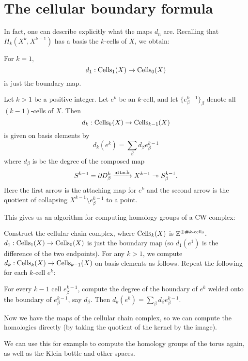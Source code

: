 \section{The cellular boundary formula}
In fact, one can describe explicitly what the maps $d_n$ are.
Recalling that $H_k(X^k, X^{k-1})$ has a basis the $k$-cells of $X$, we obtain:
\begin{theorem}
	[Cellular boundary formula for $k=1$]
	For $k=1$, \[ d_1 : \operatorname{Cells}_1(X) \to \operatorname{Cells}_0(X) \] is just the boundary map.
\end{theorem}
\begin{theorem}
	Let $k > 1$ be a positive integer.
	Let $e^k$ be an $k$-cell, and let $\{e_\beta^{k-1}\}_\beta$
	denote all $(k-1)$-cells of $X$.
	Then \[ d_k : \operatorname{Cells}_k(X) \to \operatorname{Cells}_{k-1}(X) \]
	is given on basis elements by
	\[ d_k(e^k) = \sum_\beta d_\beta e_\beta^{k-1} \]
	where $d_\beta$ is be the degree of the composed map
	\[ S^{k-1} = \partial D_\beta^k \xrightarrow{\text{attach}}
		X^{k-1} \twoheadrightarrow S_\beta^{k-1}. \]
	Here the first arrow is the attaching map for $e^k$
	and the second arrow is the quotient of collapsing
	$X^{k-1} \setminus e^{k-1}_\beta$ to a point.
\end{theorem}
This gives us an algorithm for computing homology groups of a CW complex:
\begin{itemize}
	\ii Construct the cellular chain complex,
	where $\operatorname{Cells}_k(X)$ is $\mathbb Z^{\oplus \# \text{$k$-cells}}$.
	\ii $d_1 : \operatorname{Cells}_1(X) \to \operatorname{Cells}_0(X)$ is just the boundary map
	(so $d_1(e^1)$ is the difference of the two endpoints).
	\ii For any $k > 1$, we compute $d_k : \operatorname{Cells}_k(X) \to \operatorname{Cells}_{k-1}(X)$
	on basis elements as follows.
	Repeat the following for each $k$-cell $e^k$:
	\begin{itemize}
		\ii For every $k-1$ cell $e^{k-1}_\beta$,
		compute the degree of the boundary of $e^k$ welded onto 
		the boundary of $e^{k-1}_\beta$, say $d_\beta$.
		\ii Then $d_k(e^k) = \sum_\beta d_\beta e^{k-1}_\beta$.
	\end{itemize}
	\ii Now we have the maps of the cellular chain complex,
	so we can compute the homologies directly
	(by taking the quotient of the kernel by the image).
\end{itemize}

We can use this for example to compute the homology groups of the torus again,
as well as the Klein bottle and other spaces.

